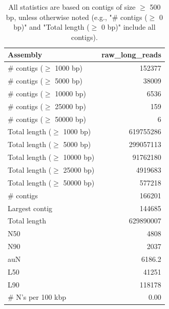 \documentclass[12pt,a4paper]{article}
\begin{document}
\begin{table}[ht]
\begin{center}
\caption{All statistics are based on contigs of size $\geq$ 500 bp, unless otherwise noted (e.g., "\# contigs ($\geq$ 0 bp)" and "Total length ($\geq$ 0 bp)" include all contigs).}
\begin{tabular}{|l*{1}{|r}|}
\hline
Assembly & raw\_long\_reads \\ \hline
\# contigs ($\geq$ 1000 bp) & 152377 \\ \hline
\# contigs ($\geq$ 5000 bp) & 38009 \\ \hline
\# contigs ($\geq$ 10000 bp) & 6536 \\ \hline
\# contigs ($\geq$ 25000 bp) & 159 \\ \hline
\# contigs ($\geq$ 50000 bp) & 6 \\ \hline
Total length ($\geq$ 1000 bp) & 619755286 \\ \hline
Total length ($\geq$ 5000 bp) & 299057113 \\ \hline
Total length ($\geq$ 10000 bp) & 91762180 \\ \hline
Total length ($\geq$ 25000 bp) & 4919683 \\ \hline
Total length ($\geq$ 50000 bp) & 577218 \\ \hline
\# contigs & 166201 \\ \hline
Largest contig & 144685 \\ \hline
Total length & 629890007 \\ \hline
N50 & 4808 \\ \hline
N90 & 2037 \\ \hline
auN & 6186.2 \\ \hline
L50 & 41251 \\ \hline
L90 & 118178 \\ \hline
\# N's per 100 kbp & 0.00 \\ \hline
\end{tabular}
\end{center}
\end{table}
\end{document}
